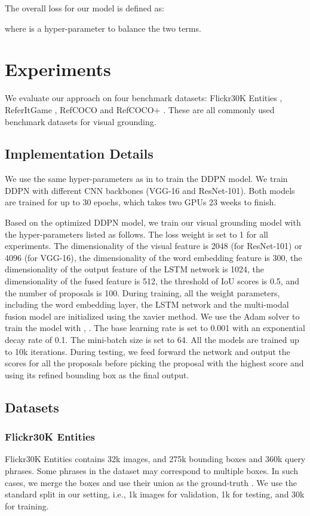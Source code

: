 \documentclass{article}
\begin{document}
The overall loss for our model is defined as:

where  is a hyper-parameter to balance the two terms.



\section{Experiments}
We evaluate our approach on four benchmark datasets: Flickr30K Entities \cite{plummer2015flickr30k}, ReferItGame \cite{kazemzadeh2014referitgame}, RefCOCO and RefCOCO+ \cite{yu2016modeling}. These are all commonly used benchmark datasets for visual grounding.

\subsection{Implementation Details}
We use the same hyper-parameters as in \cite{anderson2017up-down} to train the DDPN model. We train DDPN with different CNN backbones (VGG-16 and ResNet-101). Both models are trained for up to 30 epochs, which takes two GPUs 23 weeks to finish.

Based on the optimized DDPN model, we train our visual grounding model with the hyper-parameters listed as follows. The loss weight  is set to 1 for all experiments. The dimensionality of the visual feature  is 2048 (for ResNet-101) or 4096 (for VGG-16), the dimensionality of the word embedding feature  is 300, the dimensionality of the output feature of the LSTM network  is 1024, the dimensionality of the fused feature  is 512, the threshold of IoU scores  is 0.5, and the number of proposals  is 100. During training, all the weight parameters, including the word embedding layer, the LSTM network and the multi-modal fusion model are initialized using the {xavier} method. We use the Adam solver to train the model with , . The base learning rate is set to 0.001 with an exponential decay rate of 0.1. The mini-batch size is set to 64. All the models are trained up to 10k iterations. During testing, we feed forward the network and output the scores for all the proposals before picking the proposal with the highest score and using its refined bounding box as the final output.



\subsection{Datasets}
\subsubsection{Flickr30K Entities}
Flickr30K Entities contains 32k images, and 275k bounding boxes and 360k query phrases. Some phrases in the dataset may correspond to multiple boxes. In such cases, we merge the boxes and use their union as the ground-truth \cite{rohrbach2016grounding}. We use the standard split in our setting, i.e., 1k images for validation, 1k for testing, and 30k for training.
\end{document}
